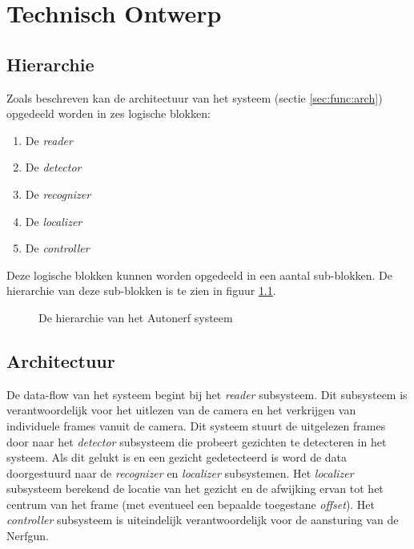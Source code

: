 \chapter{Technisch Ontwerp}
\label{ch:technical}

\section{Hierarchie}

Zoals beschreven kan de architectuur van het systeem (sectie \ref{sec:func:arch})
opgedeeld worden in zes logische blokken:

\begin{enumerate}
    \item De \emph{reader}
    \item De \emph{detector}
    \item De \emph{recognizer}
    \item De \emph{localizer}
    \item De \emph{controller}
\end{enumerate}

Deze logische blokken kunnen worden opgedeeld in een aantal sub-blokken. De
hierarchie van deze sub-blokken is te zien in figuur \ref{fig:hierarchy}.

\begin{figure}[H]
        
    \caption{De hierarchie van het Autonerf systeem}
    \label{fig:hierarchy}
\end{figure}

\section{Architectuur}

De data-flow van het systeem begint bij het \emph{reader} subsysteem. Dit subsysteem
is verantwoordelijk voor het uitlezen van de camera en het verkrijgen van individuele
frames vanuit de camera. Dit systeem stuurt de uitgelezen frames door naar het
\emph{detector} subsysteem die probeert gezichten te detecteren in het systeem.
Als dit gelukt is en een gezicht gedetecteerd is word de data doorgestuurd naar
de \emph{recognizer} en \emph{localizer} subsystemen. Het \emph{localizer}
subsysteem berekend de locatie van het gezicht en de afwijking ervan tot het
centrum van het frame (met eventueel een bepaalde toegestane \emph{offset}).
Het \emph{controller} subsysteem is uiteindelijk verantwoordelijk voor de
aansturing van de Nerfgun.


